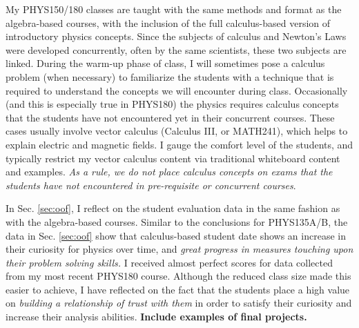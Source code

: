 \documentclass[../../../main.tex]{subfiles}
\begin{document}
My PHYS150/180 classes are taught with the same methods and format as the algebra-based courses, with the inclusion of the full calculus-based version of introductory physics concepts.  Since the subjects of calculus and Newton's Laws were developed concurrently, often by the same scientists, these two subjects are linked.  During the warm-up phase of class, I will sometimes pose a calculus problem (when necessary) to familiarize the students with a technique that is required to understand the concepts we will encounter during class.  Occasionally (and this is especially true in PHYS180) the physics requires calculus concepts that the students have not encountered yet in their concurrent courses.  These cases usually involve vector calculus (Calculus III, or MATH241), which helps to explain electric and magnetic fields.  I gauge the comfort level of the students, and typically restrict my vector calculus content via traditional whiteboard content and examples.  \textit{As a rule, we do not place calculus concepts on exams that the students have not encountered in pre-requisite or concurrent courses}.  \\ \hspace{0.1cm}

In Sec. \ref{sec:oof}, I reflect on the student evaluation data in the same fashion as with the algebra-based courses.  Similar to the conclusions for PHYS135A/B, the data in Sec. \ref{sec:oof} show that calculus-based student date shows an increase in their curiosity for physics over time, and \textit{great progress in measures touching upon their problem solving skills.}  I received almost perfect scores for data collected from my most recent PHYS180 course.  Although the reduced class size made this easier to achieve, I have reflected on the fact that the students place a high value on \textit{building a relationship of trust with them} in order to satisfy their curiosity and increase their analysis abilities. \textbf{Include examples of final projects.} %

\end{document}
